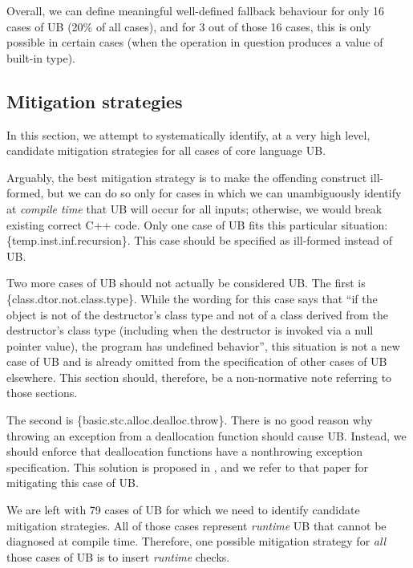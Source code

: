 {Overall, we can define meaningful well-defined fallback behaviour for only 16 cases of UB (20\% of all cases), and for 3 out of those 16 cases, this is only possible in certain cases (when the operation in question produces a value of built-in type).

\subsection{Mitigation strategies}
\label{mitigation}

In this section, we attempt to systematically identify, at a very high level, candidate mitigation strategies for all cases of core language UB.

Arguably, the best mitigation strategy is to make the offending construct ill-formed, but we can do so only for cases in which we can unambiguously identify at \emph{compile time} that UB will occur for all inputs; otherwise, we would break existing correct C++ code. Only one case of UB fits this particular situation: 
\{temp.inst.inf.recursion\}. This case should be specified as ill-formed instead of UB. %

Two more cases of UB should not actually be considered UB. The first is \{class.dtor.not.class.type\}. While the wording for this case says that ``if the object is not of the destructor's class type and not of a class derived from the destructor's class type (including when the destructor is invoked via a null pointer value), the program has undefined behavior'',
this situation is not a new case of UB and is already omitted from the specification of other cases of UB elsewhere. This section should, therefore, be a non-normative note referring to those sections.

The second is \{basic.stc.alloc.dealloc.throw\}. There is no good reason why throwing an exception from a deallocation function should cause UB. Instead, we should enforce that deallocation functions have a nonthrowing exception specification. This solution is proposed in \cite{P3424R0}, and we refer to that paper for mitigating this case of UB.

We are left with 79 cases of UB for which we need to identify candidate mitigation strategies. All of those cases represent \emph{runtime} UB that cannot be diagnosed at compile time. Therefore, one possible mitigation strategy for \emph{all} those cases of UB is to insert \emph{runtime} checks.

}
